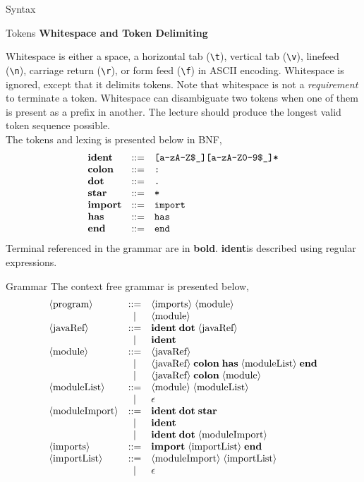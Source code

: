 \documentclass[11pt]{article}
\newcommand\DOT{\textbf{dot}}
\newcommand\COLON{\textbf{colon}}
\newcommand\STAR{\textbf{star}}
\newcommand\IDENT{\textbf{ident}}
\newcommand\HAS{\textbf{has}}
\newcommand\IMPORT{\textbf{import}}
\newcommand\END{\textbf{end}}
\newcommand\nonterm[1]{\langle\textnormal{#1}\rangle}
\begin{document}
\begin{section}{Syntax}
\begin{subsection}{Tokens}
\textbf{Whitespace and Token Delimiting} 

\medskip Whitespace is either a space, a horizontal tab (\verb|\t|), vertical tab (\verb|\v|), linefeed (\verb|\n|), carriage return (\verb|\r|), or form feed (\verb|\f|) in ASCII encoding. Whitespace is ignored, except that it delimits tokens. Note that whitespace is not a \emph{requirement} to terminate a token. Whitespace can disambiguate two tokens when one of them is present as a prefix in another. The lecture should produce the longest valid token sequence possible.\\

The tokens and lexing is presented below in BNF, 
\[
\begin{array}{lcl}
\IDENT & ::= & \verb|[a-zA-Z$_][a-zA-Z0-9$_]*|\\
\COLON & ::= & \verb|:|\\
\DOT & ::= & \verb|.|\\
\STAR & ::= & \verb|*|\\
\IMPORT & ::= &\verb|import|\\
\HAS & ::= & \verb|has|\\
\END & ::= &\verb|end|
\end{array}
\]
Terminal referenced in the grammar are in \textbf{bold}. \IDENT\;is described using regular expressions.
\end{subsection}
\begin{subsection}{Grammar}
The context free grammar is presented below,
\[
\begin{array}{lcl}
\nonterm{program} & ::= & \nonterm{imports}\;\nonterm{module}\\
& | & \nonterm{module}\\
\nonterm{javaRef} & ::= & \IDENT\;\DOT\;\nonterm{javaRef}\\
& | & \IDENT\\
\nonterm{module} & ::= & \nonterm{javaRef}\\
& | & \nonterm{javaRef}\;\COLON\;\HAS\;\nonterm{moduleList}\;\END\\
& | & \nonterm{javaRef}\;\COLON\;\nonterm{module}\\
\nonterm{moduleList} & ::= & \nonterm{module}\;\nonterm{moduleList}\\
& | & \epsilon\\
\nonterm{moduleImport} & ::= & \IDENT\;\DOT\;\STAR\\
& | & \IDENT\\
& | & \IDENT\;\DOT\;\nonterm{moduleImport}\\
\nonterm{imports} & ::= & \IMPORT\;\nonterm{importList}\;\END\\
\nonterm{importList} & ::= & \nonterm{moduleImport}\;\nonterm{importList}\\
& | & \epsilon
\end{array}
\]


\end{subsection}
\end{section}
\end{document}
